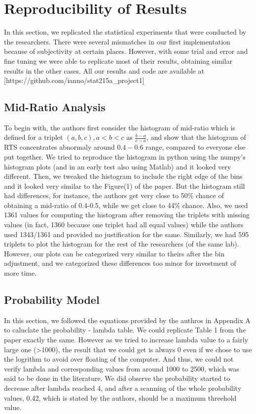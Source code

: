 \documentclass{article}
\begin{document}
    \section{Reproducibility of Results}\label{reproducibility-of-results}

In this section, we replicated the statistical experiments that were
conducted by the researchers. There were several mismatches in our first
implementation because of subjectivity at certain places. However, with
some trial and error and fine tuning we were able to replicate most of
their results, obtaining similar results in the other cases. All our
results and code are available at
{[}https://github.com/ianno/stat215a\_project1{]}

    \subsection{Mid-Ratio Analysis}\label{mid-ratio-analysis}

To begin with, the authors first consider the histogram of mid-ratio
which is defined for a triplet \((a, b, c), a<b<c\) as
\(\frac{b-a}{c-a}\), and show that the histogram of RTS concentrates
abnormaly around \(0.4-0.6\) range, compared to everyone else put
together. We tried to reproduce the histogram in python using the
numpy's histogram plots (and in an early test also using Matlab) and it
looked very different. Then, we tweaked the histogram to include the
right edge of the bins and it looked very similar to the Figure(1) of
the paper. But the histogram still had differences, for instance, the
authors get very close to 50\% chance of obtaining a mid-ratio of
0.4-0.5, while we get close to 44\% chance. Also, we used 1361 values
for computing the histogram after removing the triplets with missing
values (in fact, 1360 because one triplet had all equal values) while
the authors used 1343/1361 and provided no justification for the same.
Similarly, we had 595 triplets to plot the histogram for the rest of the
researchers (of the same lab). However, our plots can be categorized
very similar to theirs after the bin adjustment, and we categorized
these differences too minor for investment of more time.

    \subsection{Probability Model}\label{probability-model}

In this section, we followed the equations provided by the authros in
Appendix A to caluclate the probability - lambda table. We could
replicate Table 1 from the paper exactly the same. However as we tried
to increase lambda value to a fairly large one (\textgreater{}1000), the
result that we could get is always 0 even if we chose to use the
logrithm to avoid over floating of the computer. And thus, we could not
verify lambda and corresponding values from around 1000 to 2500, which
was said to be done in the literature. We did observe the probability
started to decrease after lambda reached 4, and after a scanning of the
whole probability values, 0.42, which is stated by the authors, should
be a maximum threehold value.
\end{document}

